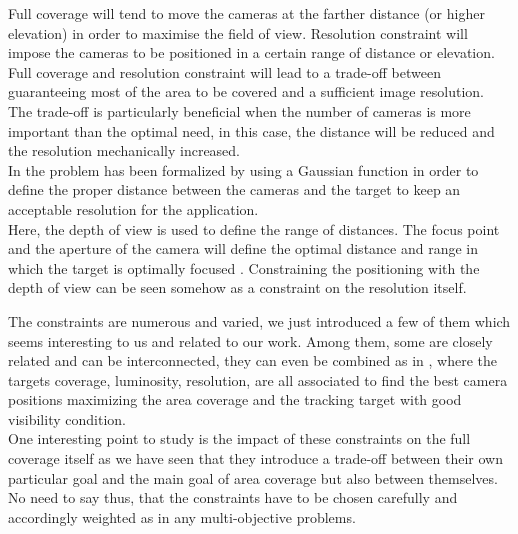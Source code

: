 \begin{itemize}
Full coverage will tend to move the cameras at the farther distance (or higher elevation) in order to maximise the field of view. Resolution constraint will impose the cameras to be positioned in a certain range of distance or elevation. Full coverage and resolution constraint will lead to a trade-off between guaranteeing most of the area to be covered and a sufficient image resolution. The trade-off is particularly beneficial when the number of cameras is more important than the optimal need, in this case, the distance will be reduced and the resolution mechanically increased. \\
   In \cite{33*reddy2012} the problem has been formalized by using a Gaussian function in order to define the proper distance between the cameras and the target to keep an acceptable resolution for the application. \\
Here, the depth of view is used to define the range of distances. The focus point and the aperture of the camera will define the optimal distance and range in which the target is optimally focused \cite{193*fu2014}. Constraining the positioning with the depth of view can be seen somehow as a constraint on the resolution itself. 

\end{itemize}

The constraints are numerous and varied, we just introduced a few of them which seems interesting to us and related to our work. Among them, some are closely related and can be interconnected, they can even be combined as in \cite{33*reddy2012}, where the targets coverage, luminosity, resolution, are all associated to find the best camera positions maximizing the area coverage and the tracking target with good visibility condition. \\
One interesting point to study is the impact of these constraints on the full coverage itself as we have seen that they introduce a trade-off between their own particular goal and the main goal of area coverage but also between themselves. No need to say thus, that the constraints have to be chosen carefully and accordingly weighted as in any multi-objective problems. 

